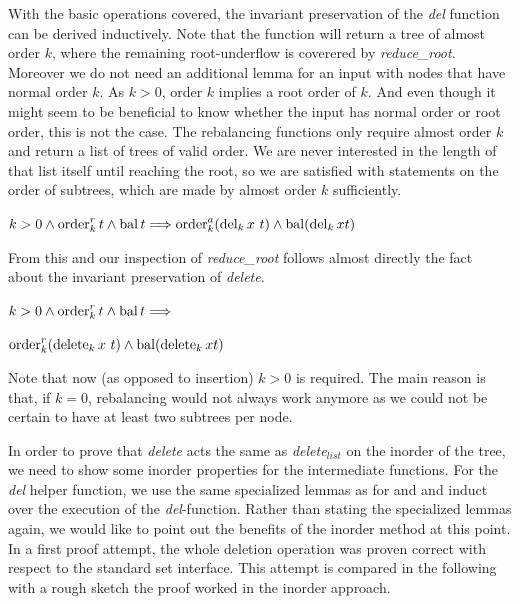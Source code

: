 With the basic operations covered,
the invariant preservation of the \textit{del} function
can be derived inductively.
Note that the function will return a tree of almost order $k$,
where the remaining root-underflow is coverered by \textit{reduce\_root}.
Moreover we do not need an additional lemma
for an input with nodes that have normal order $k$.
As $k > 0$, order $k$ implies a root order of $k$.
And even though it might seem to be beneficial to know
whether the input has normal order or root order, this is not the case.
The rebalancing functions only require
almost order $k$ and return a list of trees of valid order.
We are never interested in the length of that list itself
until reaching the root, so we are satisfied with statements
on the order of subtrees,
which are made by almost order $k$ sufficiently.

\begin{lemma}
    $k > 0 \wedge \operatorname{order}^r_k t \wedge \operatorname{bal} t \Longrightarrow
    \operatorname{order}^a_k (\operatorname{del}_k x\ t) \wedge \operatorname{bal} (\operatorname{del}_k x t)$
\end{lemma}

From this and our inspection of \textit{reduce\_root}
follows almost directly the fact about the invariant
preservation of \textit{delete}.

\begin{samepage}
\begin{theorem}
    $k > 0 \wedge \operatorname{order}^r_k t \wedge \operatorname{bal} t \Longrightarrow$ \\
    \begin{center}
    $\operatorname{order}^r_k (\operatorname{delete}_k x\ t) \wedge \operatorname{bal} (\operatorname{delete}_k x t)$
    \end{center}
\end{theorem}
\end{samepage}

Note that now (as opposed to insertion) $k > 0$ is required.
The main reason is that,
if $k = 0$, rebalancing would not always work anymore
as we could not be certain to have at least two subtrees per node.

In order to prove that \textit{delete} acts the same as
\textit{delete}$_{list}$ on the inorder of the tree,
we need to show some inorder properties for the intermediate functions.
For the \textit{del} helper function, 
we use the same specialized lemmas
as for  and 
and induct over the execution of the \textit{del}-function.
Rather than stating the specialized lemmas again, we would like to point
out the benefits of the inorder method at this point.
In a first proof attempt, the whole deletion operation was
proven correct with respect to the standard set interface.
This attempt is compared in the following with a rough sketch
the proof worked in the inorder approach.

